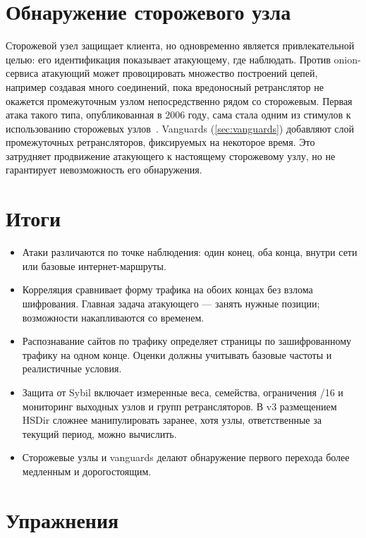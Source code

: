 \section{Обнаружение сторожевого узла}\label{sec:att-guard}

Сторожевой узел защищает клиента, но одновременно является привлекательной целью: его идентификация показывает атакующему, где наблюдать. Против onion-сервиса атакующий может провоцировать множество построений цепей, например создавая много соединений, пока вредоносный ретранслятор не окажется промежуточным узлом непосредственно рядом со сторожевым. Первая атака такого типа, опубликованная в 2006 году, сама стала одним из стимулов к использованию сторожевых узлов~\cite{overlier2006locating}. Vanguards (\cref{sec:vanguards}) добавляют слой промежуточных ретрансляторов, фиксируемых на некоторое время. Это затрудняет продвижение атакующего к настоящему сторожевому узлу, но не гарантирует невозможность его обнаружения.

\section*{Итоги}
\begin{itemize}
  \item Атаки различаются по точке наблюдения: один конец, оба конца, внутри сети или базовые интернет-маршруты.
  \item Корреляция сравнивает форму трафика на обоих концах без взлома шифрования. Главная задача атакующего — занять нужные позиции; возможности накапливаются со временем.
  \item Распознавание сайтов по трафику определяет страницы по зашифрованному трафику на одном конце. Оценки должны учитывать базовые частоты и реалистичные условия.
  \item Защита от Sybil включает измеренные веса, семейства, ограничения /16 и мониторинг выходных узлов и групп ретрансляторов. В v3 размещением HSDir сложнее манипулировать заранее, хотя узлы, ответственные за текущий период, можно вычислить.
  \item Сторожевые узлы и vanguards делают обнаружение первого перехода более медленным и дорогостоящим.
\end{itemize}

\section*{Упражнения}

